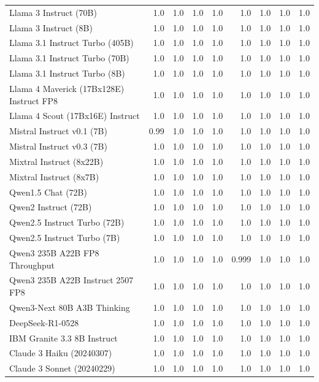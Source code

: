 \begin{table}[htp]
{\begin{tabular}{lrrrrrrrr}
Llama 3 Instruct (70B) & 1.0 & 1.0 & 1.0 & 1.0 & 1.0 & 1.0 & 1.0 & 1.0 \\
Llama 3 Instruct (8B) & 1.0 & 1.0 & 1.0 & 1.0 & 1.0 & 1.0 & 1.0 & 1.0 \\
Llama 3.1 Instruct Turbo (405B) & 1.0 & 1.0 & 1.0 & 1.0 & 1.0 & 1.0 & 1.0 & 1.0 \\
Llama 3.1 Instruct Turbo (70B) & 1.0 & 1.0 & 1.0 & 1.0 & 1.0 & 1.0 & 1.0 & 1.0 \\
Llama 3.1 Instruct Turbo (8B) & 1.0 & 1.0 & 1.0 & 1.0 & 1.0 & 1.0 & 1.0 & 1.0 \\
Llama 4 Maverick (17Bx128E) Instruct FP8 & 1.0 & 1.0 & 1.0 & 1.0 & 1.0 & 1.0 & 1.0 & 1.0 \\
Llama 4 Scout (17Bx16E) Instruct & 1.0 & 1.0 & 1.0 & 1.0 & 1.0 & 1.0 & 1.0 & 1.0 \\
Mistral Instruct v0.1 (7B) & 0.99 & 1.0 & 1.0 & 1.0 & 1.0 & 1.0 & 1.0 & 1.0 \\
Mistral Instruct v0.3 (7B) & 1.0 & 1.0 & 1.0 & 1.0 & 1.0 & 1.0 & 1.0 & 1.0 \\
Mixtral Instruct (8x22B) & 1.0 & 1.0 & 1.0 & 1.0 & 1.0 & 1.0 & 1.0 & 1.0 \\
Mixtral Instruct (8x7B) & 1.0 & 1.0 & 1.0 & 1.0 & 1.0 & 1.0 & 1.0 & 1.0 \\
Qwen1.5 Chat (72B) & 1.0 & 1.0 & 1.0 & 1.0 & 1.0 & 1.0 & 1.0 & 1.0 \\
Qwen2 Instruct (72B) & 1.0 & 1.0 & 1.0 & 1.0 & 1.0 & 1.0 & 1.0 & 1.0 \\
Qwen2.5 Instruct Turbo (72B) & 1.0 & 1.0 & 1.0 & 1.0 & 1.0 & 1.0 & 1.0 & 1.0 \\
Qwen2.5 Instruct Turbo (7B) & 1.0 & 1.0 & 1.0 & 1.0 & 1.0 & 1.0 & 1.0 & 1.0 \\
Qwen3 235B A22B FP8 Throughput & 1.0 & 1.0 & 1.0 & 1.0 & 0.999 & 1.0 & 1.0 & 1.0 \\
Qwen3 235B A22B Instruct 2507 FP8 & 1.0 & 1.0 & 1.0 & 1.0 & 1.0 & 1.0 & 1.0 & 1.0 \\
Qwen3-Next 80B A3B Thinking & 1.0 & 1.0 & 1.0 & 1.0 & 1.0 & 1.0 & 1.0 & 1.0 \\
DeepSeek-R1-0528 & 1.0 & 1.0 & 1.0 & 1.0 & 1.0 & 1.0 & 1.0 & 1.0 \\
IBM Granite 3.3 8B Instruct & 1.0 & 1.0 & 1.0 & 1.0 & 1.0 & 1.0 & 1.0 & 1.0 \\
Claude 3 Haiku (20240307) & 1.0 & 1.0 & 1.0 & 1.0 & 1.0 & 1.0 & 1.0 & 1.0 \\
Claude 3 Sonnet (20240229) & 1.0 & 1.0 & 1.0 & 1.0 & 1.0 & 1.0 & 1.0 & 1.0 \\

\end{tabular}}
\end{table}
